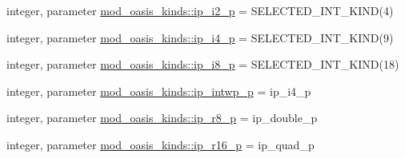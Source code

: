 \begin{DoxyCompactItemize}
\item 
integer, parameter \hyperlink{namespacemod__oasis__kinds_a27d396cfa521ce47479118dee466eb3c}{mod\+\_\+oasis\+\_\+kinds\+::ip\+\_\+i2\+\_\+p} = S\+E\+L\+E\+C\+T\+E\+D\+\_\+\+I\+N\+T\+\_\+\+K\+I\+ND(4)
\item 
integer, parameter \hyperlink{namespacemod__oasis__kinds_a1e3c90ad6857ff8675d3e2548d516200}{mod\+\_\+oasis\+\_\+kinds\+::ip\+\_\+i4\+\_\+p} = S\+E\+L\+E\+C\+T\+E\+D\+\_\+\+I\+N\+T\+\_\+\+K\+I\+ND(9)
\item 
integer, parameter \hyperlink{namespacemod__oasis__kinds_a8dbd6aa926433f02df94bca462f122df}{mod\+\_\+oasis\+\_\+kinds\+::ip\+\_\+i8\+\_\+p} = S\+E\+L\+E\+C\+T\+E\+D\+\_\+\+I\+N\+T\+\_\+\+K\+I\+ND(18)
\item 
integer, parameter \hyperlink{namespacemod__oasis__kinds_a7bf99d9ca4dbcaa5e6207e48835d2ca2}{mod\+\_\+oasis\+\_\+kinds\+::ip\+\_\+intwp\+\_\+p} = ip\+\_\+i4\+\_\+p
\item 
integer, parameter \hyperlink{namespacemod__oasis__kinds_a6129e979d32b55cb020fb76068ce9808}{mod\+\_\+oasis\+\_\+kinds\+::ip\+\_\+r8\+\_\+p} = ip\+\_\+double\+\_\+p
\item 
integer, parameter \hyperlink{namespacemod__oasis__kinds_a865ff1d43dba43a1ff14004e28d51542}{mod\+\_\+oasis\+\_\+kinds\+::ip\+\_\+r16\+\_\+p} = ip\+\_\+quad\+\_\+p
\end{DoxyCompactItemize}
